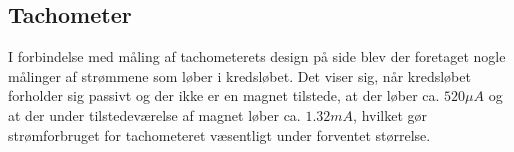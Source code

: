 \subsection{Tachometer}

I forbindelse med måling af tachometerets design på side \pageref{sub:systemarkitektur_tachometer} blev der foretaget nogle målinger af strømmene som løber i kredsløbet. Det viser sig, når kredsløbet forholder sig passivt og der ikke er en magnet tilstede, at der løber ca. $520\mu A$ og at der under tilstedeværelse af magnet løber ca. $1.32mA$, hvilket gør strømforbruget for tachometeret væsentligt under forventet størrelse.